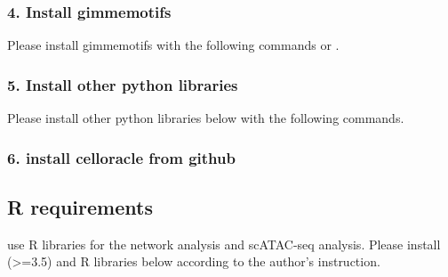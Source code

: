 \documentclass[letterpaper,10pt,english]{sphinxmanual}
\begin{document}
\subsubsection{4. Install gimmemotifs}
\label{\detokenize{installation/index:install-gimmemotifs}}
Please install gimmemotifs with the following commands or  .

\begin{sphinxVerbatim}[commandchars=\\\{\}]
   
\end{sphinxVerbatim}


\subsubsection{5. Install other python libraries}
\label{\detokenize{installation/index:install-other-python-libraries}}
Please install other python libraries below with the following commands.

\begin{sphinxVerbatim}[commandchars=\\\{\}]
      
\end{sphinxVerbatim}


\subsubsection{6. install celloracle from github}
\label{\detokenize{installation/index:install-celloracle-from-github}}
\begin{sphinxVerbatim}[commandchars=\\\{\}]
  
\end{sphinxVerbatim}


\subsection{R requirements}
\label{\detokenize{installation/index:r-requirements}}
 use R libraries for the network analysis and scATAC-seq analysis.
Please install  (\textgreater{}=3.5) and R libraries below according to the author’s instruction.
\end{document}
